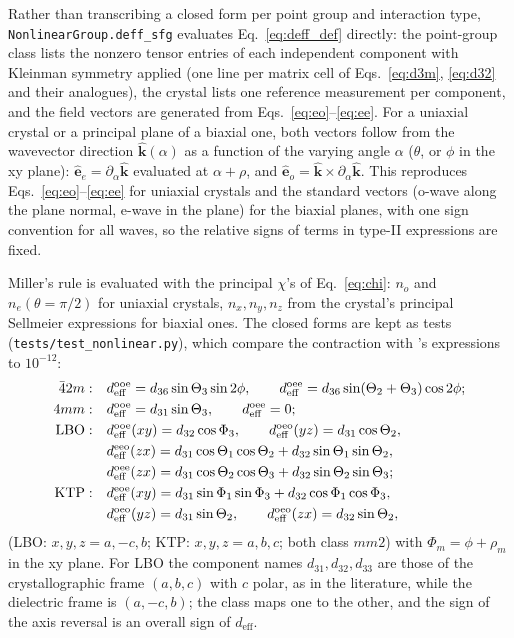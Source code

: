 \documentclass[aps,pra,preprint,amsmath,amssymb,nofootinbib,superscriptaddress]{revtex4-2}
\newcommand{\ueff}{d_{\mathrm{eff}}}
\newcommand{\vecu}[1]{\hat{\bm{#1}}}
\begin{document}
Rather than transcribing a closed form per point group and interaction
type, \texttt{NonlinearGroup.}\allowbreak\texttt{deff\_sfg} evaluates
Eq.~\eqref{eq:deff_def} directly: the point-group class lists the nonzero
tensor entries of each independent component with Kleinman symmetry
applied (one line per matrix cell of Eqs.~\eqref{eq:d3m},
\eqref{eq:d32} and their analogues), the crystal lists one reference
measurement per component, and the field vectors are generated from
Eqs.~\eqref{eq:eo}--\eqref{eq:ee}. For a uniaxial crystal or a principal
plane of a biaxial one, both vectors follow from the wavevector direction
$\vecu k(\alpha)$ as a function of the varying angle $\alpha$ ($\theta$,
or $\phi$ in the xy plane): $\vecu e_e=\partial_\alpha\vecu k$ evaluated at
$\alpha+\rho$, and $\vecu e_o=\vecu k\times\partial_\alpha\vecu k$. This
reproduces Eqs.~\eqref{eq:eo}--\eqref{eq:ee} for uniaxial crystals and the
standard vectors (o-wave along the plane normal, e-wave in the plane) for
the biaxial planes, with one sign convention for all waves, so the
relative signs of terms in type-II expressions are fixed.

Miller's rule is evaluated with the principal $\chi$'s of
Eq.~\eqref{eq:chi}: $n_o$ and $n_e(\theta{=}\pi/2)$ for uniaxial crystals,
$n_x,n_y,n_z$ from the crystal's principal Sellmeier expressions for
biaxial ones. The closed forms are kept as tests
(\texttt{tests/test\_nonlinear.py}), which compare the contraction with
\cite{Dmitriev}'s expressions to $10^{-12}$:
\begin{align}
\bar 42m:&\quad \ueff^{\rm ooe}=d_{36}\sin\Theta_3\sin2\phi,\qquad
\ueff^{\rm oee}=d_{36}\sin(\Theta_2+\Theta_3)\cos2\phi;\\
4mm:&\quad \ueff^{\rm ooe}=d_{31}\sin\Theta_3,\qquad \ueff^{\rm oee}=0;\\
\text{LBO}:&\quad \ueff^{\rm ooe}(xy)=d_{32}\cos\Phi_3,\qquad
\ueff^{\rm oeo}(yz)=d_{31}\cos\Theta_2,\notag\\
&\quad \ueff^{\rm eeo}(zx)=d_{31}\cos\Theta_1\cos\Theta_2+d_{32}\sin\Theta_1\sin\Theta_2,\notag\\
&\quad \ueff^{\rm oee}(zx)=d_{31}\cos\Theta_2\cos\Theta_3+d_{32}\sin\Theta_2\sin\Theta_3;\\
\text{KTP}:&\quad \ueff^{\rm eoe}(xy)=d_{31}\sin\Phi_1\sin\Phi_3+d_{32}\cos\Phi_1\cos\Phi_3,\notag\\
&\quad \ueff^{\rm oeo}(yz)=d_{31}\sin\Theta_2,\qquad \ueff^{\rm oeo}(zx)=d_{32}\sin\Theta_2,
\end{align}
(LBO: $x,y,z=a,-c,b$; KTP: $x,y,z=a,b,c$; both class $mm2$)
with $\Phi_m=\phi+\rho_m$ in the xy plane. For LBO the component names
$d_{31},d_{32},d_{33}$ are those of the crystallographic frame $(a,b,c)$
with $c$ polar, as in the literature, while the dielectric frame is
$(a,-c,b)$; the class maps one to the other, and the sign of the axis
reversal is an overall sign of $\ueff$.
\end{document}

